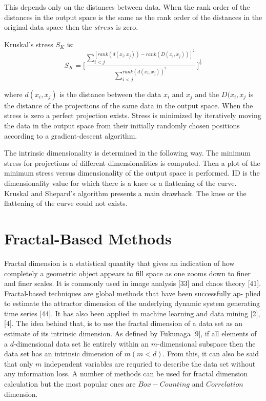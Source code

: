 \documentclass[journal]{IEEEtran}
\begin{document}
This depends only on the distances between data. When the rank order of the distances in the 
output space is the same as the rank order of the distances in the original data space then the \(stress\) is zero.

Kruskal’s stress \(S_K\) is:
\begin{equation}
  \label{eq_stress_sk}
  S_K =  \Big[\frac{\sum_{i<j}^{[rank(d(x_i, x_j)) - rank(D(x_i, x_j))]^2}}{\sum_{i<j}^{rank(d(x_i, x_j))^2}}\Big]^{\frac{1}{2}}
\end{equation}
  
where \(d(x_i, x_j)\) is the distance between the data \(x_i\) and \(x_j\) and the \(D(x_i, x_j\) is 
the distance of the projections of the same data in the output space. When the stress is zero a perfect projection exists. 
Stress is minimized by iteratively moving the data in the output space from their initially randomly chosen positions 
according to a gradient-descent algorithm.

The intrinsic dimensionality is determined in the following way. The minimum stress for projections of different dimensionalities is computed. 
Then a plot of the minimum stress versus dimensionality of the output space is performed. 
ID is the dimensionality value for which there is a knee or a flattening of the curve. 
Kruskal and Shepard’s algorithm presents a main drawback. The knee or the flattening of the curve could not exists.


\section{Fractal-Based Methods}
Fractal dimension is a statistical quantity that gives an indication of how completely a 
geometric object appears to fill space as one zooms down to finer and finer scales.
It is commonly used in image analysis [33] and chaos theory [41].
Fractal-based techniques are global methods that have been successfully ap-
plied to estimate the attractor dimension of the underlying dynamic system
generating time series [44].
It has also been applied in machine learning and data mining [2], [4]. The idea behind that, is to use the fractal dimension of a data set 
as an estimate of its intrinsic dimension. As defined by Fukunaga [9], if all elements of a 
\(d\)-dimensional data set lie entirely within an \(m\)-dimensional subspace then the data set has an intrinsic dimension of \(m (m < d)\).
From this, it can also be said that only \(m\) independent variables are requried to describe the data set without any information loss.
A number of methods can be used for fractal dimension calculation but the most popular ones are \(Box-Counting\) and \(Correlation\) dimension.
\end{document}
